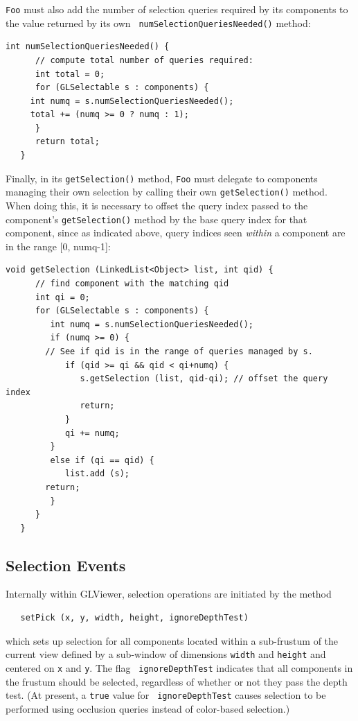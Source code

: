 \documentclass{article}
\begin{document}
{\tt Foo} must also add the number of selection queries required by
its components to the value returned by its own {\tt
numSelectionQueriesNeeded()} method:
\begin{lstlisting}[]
   int numSelectionQueriesNeeded() {
      // compute total number of queries required:
      int total = 0;
      for (GLSelectable s : components) {
	 int numq = s.numSelectionQueriesNeeded();
	 total += (numq >= 0 ? numq : 1);
      }
      return total;
   }
\end{lstlisting}
Finally, in its {\tt getSelection()} method,
{\tt Foo} must delegate to components managing their own selection
by calling their own {\tt getSelection()} method. When doing this,
it is necessary to offset the query index passed to the component's
{\tt getSelection()} method by the base query index for that
component, since as indicated above, query indices seen
{\it within} a component
are in the range [0, numq-1]:
\begin{lstlisting}[]
   void getSelection (LinkedList<Object> list, int qid) {
      // find component with the matching qid
      int qi = 0;
      for (GLSelectable s : components) {
         int numq = s.numSelectionQueriesNeeded();
         if (numq >= 0) {
	    // See if qid is in the range of queries managed by s.
            if (qid >= qi && qid < qi+numq) {
               s.getSelection (list, qid-qi); // offset the query index
               return;
            }
            qi += numq;
         }
         else if (qi == qid) {
            list.add (s);
	    return;
         }
      }
   }
\end{lstlisting}

\subsection{Selection Events}
\label{SelectionHandlingSec}

Internally within GLViewer,  selection operations are initiated by
the method
\begin{verbatim}
   setPick (x, y, width, height, ignoreDepthTest)
\end{verbatim}
which sets up selection for all components located within a sub-frustum
of the current view defined by a sub-window of dimensions {\tt width}
and {\tt height} and centered on {\tt x} and {\tt y}.  The flag {\tt
ignoreDepthTest} indicates that all components in the frustum
should be selected, regardless of whether or not they pass the depth
test. (At present, a {\tt true} value for {\tt
ignoreDepthTest} causes selection to be performed using
occlusion queries instead of color-based selection.)
\end{document}
